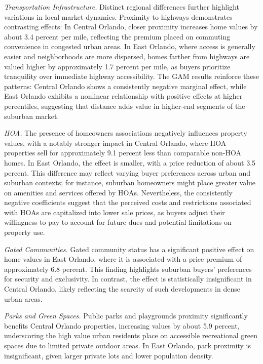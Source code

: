 \textit{Transportation Infrastructure.}
Distinct regional differences further highlight variations in local market dynamics. Proximity to highways demonstrates contrasting effects: In Central Orlando, closer proximity increases home values by about 3.4 percent per mile, reflecting the premium placed on commuting convenience in congested urban areas. In East Orlando, where access is generally easier and neighborhoods are more dispersed, homes farther from highways are valued higher by approximately 1.7 percent per mile, as buyers prioritize tranquility over immediate highway accessibility. The GAM results reinforce these patterns: Central Orlando shows a consistently negative marginal effect, while East Orlando exhibits a nonlinear relationship with positive effects at higher percentiles, suggesting that distance adds value in higher-end segments of the suburban market.

\textit{HOA.}
The presence of homeowners associations negatively influences property values, with a notably stronger impact in Central Orlando, where HOA properties sell for approximately 9.1 percent  less than comparable non-HOA homes. In East Orlando, the effect is smaller, with a price reduction of about 3.5 percent. This difference may reflect varying buyer preferences across urban and suburban contexts; for instance, suburban homeowners might place greater value on amenities and services offered by HOAs. Nevertheless, the consistently negative coefficients suggest that the perceived costs and restrictions associated with HOAs are capitalized into lower sale prices, as buyers adjust their willingness to pay to account for future dues and potential limitations on property use.

\textit{Gated Communities.}
Gated community status has a significant positive effect on home values in East Orlando, where it is associated with a price premium of approximately 6.8 percent. This finding highlights suburban buyers' preferences for security and exclusivity. In contrast, the effect is statistically insignificant in Central Orlando, likely reflecting the scarcity of such developments in dense urban areas. 

\textit{Parks and Green Spaces.}
Public parks and playgrounds proximity significantly benefits Central Orlando properties, increasing values by about 5.9 percent, underscoring the high value urban residents place on accessible recreational green spaces due to limited private outdoor areas. In East Orlando, park proximity is insignificant, given larger private lots and lower population density.

